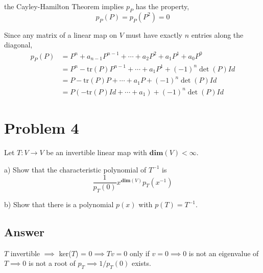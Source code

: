 \documentclass[
	12pt, %
]{fphw}
\newcommand\br{\vspace{10 pt}}
\newcommand\0{\mathbf{0}}
\renewcommand\dim[1]{\mathbf{dim}(#1)}
\newcommand\tr{\text{tr}}
\begin{document}
the Cayley-Hamilton Theorem implies $p_P$ has the property,
$$
p_P(P) = p_P(P^2) = 0
$$

Since any matrix of a linear map on $V$ must have exactly $n$ entries along the diagonal,
\begin{align*}
p_P(P) &= P^n + a_{n-1} P^{n-1} + \cdots + a_2 P^2 + a_1 P^1 + a_0 P^0\\
 &= P^n - \tr (P) P^{n-1} +\cdots + a_1 P^1  + (-1)^n \det (P) Id\\
 &= P - \tr (P) P +\cdots + a_1 P  + (-1)^n \det (P) Id\\
 &= P(-\tr(P)Id + \cdots + a_1) + (-1)^n \det(P) Id
\end{align*}

\newpage 
\section*{Problem 4}
\begin{problem}
Let $T : V \to V$ be an invertible linear map with $\dim{V} < \infty$.

\br
\noindent
a) Show that the characteristic polynomial of $T^{-1}$ is
\begin{equation*}
\frac{1}{p_T(0)}x^{\dim{V}}p_T(x^{-1})
\end{equation*}

\noindent
b) Show that there is a polynomial $p(x)$ with $p(T) =T^{-1}$.
\end{problem}

\subsection*{Answer} $T$ invertible $\implies$ ker($T$) = $0 \implies Tv = 0$ only if $v = 0 \implies 0$ is not an eigenvalue of $T \implies 0$ is not a root of $p_T \implies 1/{p_T(0)}$ exists.

\newpage
\end{document}
